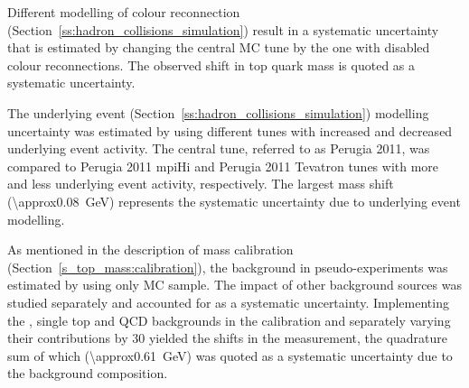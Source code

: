 \begin{description}[wide=\parindent]


\item [Colour reconnection.] Different modelling of colour reconnection (Section~\ref{ss:hadron_collisions_simulation})
result in a systematic uncertainty that is estimated by changing the central MC tune by the one with disabled colour
reconnections. The observed shift in top quark mass is quoted as a systematic uncertainty.

\item [Underlying event.] The underlying event (Section~\ref{ss:hadron_collisions_simulation}) modelling uncertainty was
estimated by using different \PYTHIA tunes with increased and decreased underlying event activity. The central tune,
referred to as Perugia 2011, was compared to Perugia 2011 mpiHi and Perugia 2011 Tevatron tunes \autocite{perugia_tunes}
with more and less underlying event activity, respectively. The largest mass shift (\SI{\approx0.08}{\GeV}) represents
the systematic uncertainty due to underlying event modelling.



\item [Background modelling.]
As mentioned in the description of mass calibration (Section~\ref{s_top_mass:calibration}), the background in
pseudo-experiments was estimated by using only \WpJets MC sample. The impact of other background sources was studied
separately and accounted for as a systematic uncertainty. Implementing the \ZpJets, single top and QCD backgrounds in
the calibration and separately varying their contributions by \SI{30}{\pc} yielded the shifts in the measurement, the
quadrature sum of which (\SI{\approx0.61}{\GeV}) was quoted as a systematic uncertainty due to the background
composition.


\end{description}
